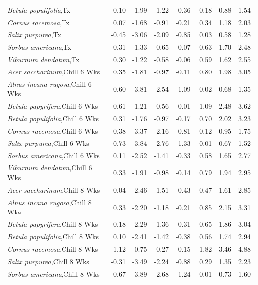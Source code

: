\documentclass{article}\usepackage[]{graphicx}\usepackage[]{color}
\begin{document}
\begin{longtable}{lrrrrrrr}
  \textit{Betula populifolia},Tx & -0.10 & -1.99 & -1.22 & -0.36 & 0.18 & 0.88 & 1.54 \\ 
  \textit{Cornus racemosa},Tx & 0.07 & -1.68 & -0.91 & -0.21 & 0.34 & 1.18 & 2.03 \\ 
  \textit{Salix purpurea},Tx & -0.45 & -3.06 & -2.09 & -0.85 & 0.03 & 0.58 & 1.28 \\ 
  \textit{Sorbus americana},Tx & 0.31 & -1.33 & -0.65 & -0.07 & 0.63 & 1.70 & 2.48 \\ 
  \textit{Viburnum dendatum},Tx & 0.30 & -1.22 & -0.58 & -0.06 & 0.59 & 1.62 & 2.55 \\ 
  \textit{Acer saccharinum},Chill 6 Wks & 0.35 & -1.81 & -0.97 & -0.11 & 0.80 & 1.98 & 3.05 \\ 
  \textit{Alnus incana rugosa},Chill 6 Wks & -0.60 & -3.81 & -2.54 & -1.09 & 0.02 & 0.68 & 1.35 \\ 
  \textit{Betula papyrifera},Chill 6 Wks & 0.61 & -1.21 & -0.56 & -0.01 & 1.09 & 2.48 & 3.62 \\ 
  \textit{Betula populifolia},Chill 6 Wks & 0.31 & -1.76 & -0.97 & -0.17 & 0.70 & 2.02 & 3.23 \\ 
  \textit{Cornus racemosa},Chill 6 Wks & -0.38 & -3.37 & -2.16 & -0.81 & 0.12 & 0.95 & 1.75 \\ 
  \textit{Salix purpurea},Chill 6 Wks & -0.73 & -3.84 & -2.76 & -1.33 & -0.01 & 0.67 & 1.52 \\ 
  \textit{Sorbus americana},Chill 6 Wks & 0.11 & -2.52 & -1.41 & -0.33 & 0.58 & 1.65 & 2.77 \\ 
  \textit{Viburnum dendatum},Chill 6 Wks & 0.33 & -1.91 & -0.98 & -0.14 & 0.79 & 1.94 & 2.95 \\ 
  \textit{Acer saccharinum},Chill 8 Wks & 0.04 & -2.46 & -1.51 & -0.43 & 0.47 & 1.61 & 2.85 \\ 
  \textit{Alnus incana rugosa},Chill 8 Wks & 0.33 & -2.20 & -1.18 & -0.21 & 0.85 & 2.15 & 3.31 \\ 
  \textit{Betula papyrifera},Chill 8 Wks & 0.18 & -2.29 & -1.36 & -0.31 & 0.65 & 1.86 & 3.04 \\ 
  \textit{Betula populifolia},Chill 8 Wks & 0.10 & -2.41 & -1.42 & -0.38 & 0.56 & 1.74 & 2.94 \\ 
  \textit{Cornus racemosa},Chill 8 Wks & 1.12 & -0.75 & -0.27 & 0.15 & 1.82 & 3.46 & 4.88 \\ 
  \textit{Salix purpurea},Chill 8 Wks & -0.31 & -3.49 & -2.24 & -0.88 & 0.29 & 1.35 & 2.23 \\ 
  \textit{Sorbus americana},Chill 8 Wks & -0.67 & -3.89 & -2.68 & -1.24 & 0.01 & 0.73 & 1.60 \\ 

\end{longtable}
\end{document}
